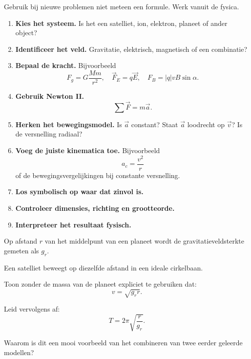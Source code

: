 \documentclass{ximera}
\begin{document}


Gebruik bij nieuwe problemen niet meteen een formule. Werk vanuit de
fysica.

\begin{enumerate}
  \item \textbf{Kies het systeem.}
        Is het een satelliet, ion, elektron, planeet of ander object?
  \item \textbf{Identificeer het veld.}
        Gravitatie, elektrisch, magnetisch of een combinatie?
  \item \textbf{Bepaal de kracht.}
        Bijvoorbeeld
        \[
        F_g=G\frac{Mm}{r^2},
        \quad
        \vec F_E=q\vec E,
        \quad
        F_B=|q|vB\sin\alpha.
        \]
  \item \textbf{Gebruik Newton II.}
        \[
        \sum\vec F=m\vec a.
        \]
  \item \textbf{Herken het bewegingsmodel.}
        Is $\vec a$ constant? Staat $\vec a$ loodrecht op $\vec v$?
        Is de versnelling radiaal?
  \item \textbf{Voeg de juiste kinematica toe.}
        Bijvoorbeeld
        \[
        a_c=\frac{v^2}{r}
        \]
        of de bewegingsvergelijkingen bij constante versnelling.
  \item \textbf{Los symbolisch op waar dat zinvol is.}
  \item \textbf{Controleer dimensies, richting en grootteorde.}
  \item \textbf{Interpreteer het resultaat fysisch.}
\end{enumerate}




\begin{oefening}{\oefU\ESS}

Op afstand $r$ van het middelpunt van een planeet wordt de
gravitatieveldsterkte gemeten als $g_r$.

Een satelliet beweegt op diezelfde afstand in een ideale cirkelbaan.

\begin{question}
Toon zonder de massa van de planeet expliciet te gebruiken dat:
\[
\boxed{
v=\sqrt{g_rr}.
}
\]
\end{question}

\begin{question}
Leid vervolgens af:
\[
\boxed{
T=2\pi\sqrt{\frac r{g_r}}.
}
\]
\end{question}

\begin{question}
Waarom is dit een mooi voorbeeld van het combineren van twee eerder
geleerde modellen?
\end{question}

\end{oefening}
\end{document}
